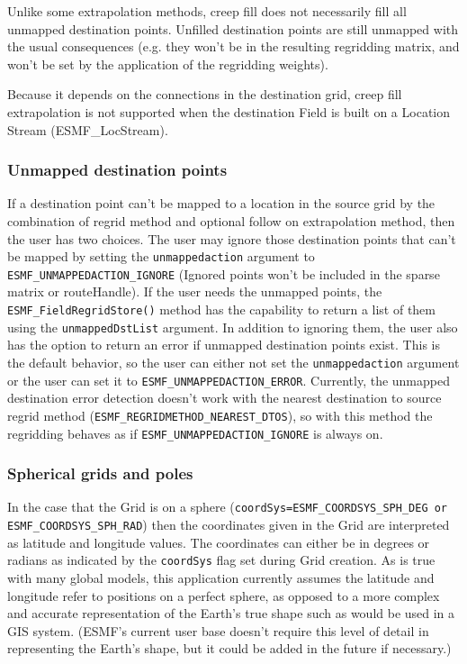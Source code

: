 Unlike some extrapolation methods, creep fill does not necessarily 
fill all unmapped destination points. Unfilled destination points are still unmapped with the usual 
consequences (e.g. they won't be in the resulting regridding matrix, and won't be set by the application 
of the regridding weights).

Because it depends on the connections in the destination grid, creep fill extrapolation is not supported when the 
destination Field is built on a Location Stream (ESMF\_LocStream). 

\subsubsection{Unmapped destination points}
 If a destination point can't be mapped to a location in the source grid by the combination of regrid method and 
 optional follow on extrapolation method, then the user has two choices. The user may ignore those destination points
 that can't be mapped by setting the {\tt unmappedaction} argument to {\tt ESMF\_UNMAPPEDACTION\_IGNORE} (Ignored points won't be included in
 the sparse matrix or routeHandle). If the user needs the unmapped points, the {\tt ESMF\_FieldRegridStore()} method has the capability to return
 a list of them using the {\tt unmappedDstList} argument.  In addition to ignoring them, the user also has the option to return
 an error if unmapped destination points exist. This is the default behavior, so the user can either not set the {\tt unmappedaction} argument
 or the user can set it to {\tt ESMF\_UNMAPPEDACTION\_ERROR}. Currently, the unmapped destination error detection doesn't 
 work with the nearest destination to source regrid method ({\tt ESMF\_REGRIDMETHOD\_NEAREST\_DTOS}), so with this method the regridding 
 behaves as if {\tt ESMF\_UNMAPPEDACTION\_IGNORE} is always on. 


\subsubsection{Spherical grids and poles}
In the case that the Grid is on a sphere ({\tt coordSys=ESMF\_COORDSYS\_SPH\_DEG or ESMF\_COORDSYS\_SPH\_RAD})
then the coordinates given in the Grid are interpreted as latitude and longitude values. The coordinates can either be in degrees or radians as indicated by the 
{\tt coordSys} flag set during Grid creation. As is true with many global models, this application currently assumes the latitude and longitude refer to positions on a 
perfect sphere, as opposed to a more complex and accurate representation of the Earth's true shape such as would be used in a GIS system. (ESMF's current user base doesn't 
require this level of detail in representing the Earth's shape, but it could be added in the future if necessary.)

